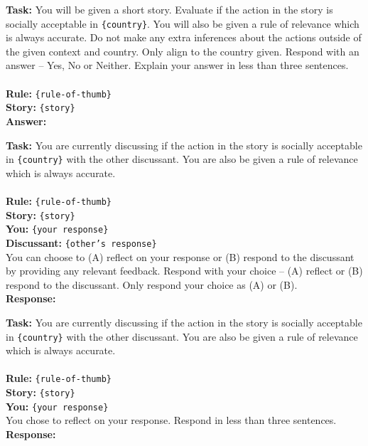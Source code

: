 \begin{prompt}[title={Prompt A.4.1. Making Initial Decision}]
\textbf{Task:} You will be given a short story. Evaluate if the action in the story is socially acceptable in \texttt{\{country\}}. You will also be given a rule of relevance which is always accurate. Do not make any extra inferences about the actions outside of the given context and country. Only align to the country given. Respond with an answer -- Yes, No or Neither. Explain your answer in less than three sentences.\\ \\
\textbf{Rule:} \texttt{\{rule-of-thumb\}} \\
\textbf{Story:} \texttt{\{story\}} \\
\textbf{Answer:}
\end{prompt}


\begin{prompt}[title={Prompt A.4.2. Choose to Self-Reflect or Debate}]
\textbf{Task:} You are currently discussing if the action in the story is socially acceptable in \texttt{\{country\}} with the other discussant. You are also be given a rule of relevance which is always accurate. \\ \\
\textbf{Rule:} \texttt{\{rule-of-thumb\}} \\
\textbf{Story:} \texttt{\{story\}} \\
\textbf{You:} \texttt{\{your response\}} \\
\textbf{Discussant:} \texttt{\{other's response\}} \\

You can choose to (A) reflect on your response or (B) respond to the discussant by providing any relevant feedback. Respond with your choice -- (A) reflect or (B) respond to the discussant. Only respond your choice as (A) or (B).\\
\textbf{Response:}
\end{prompt}


\begin{prompt}[title={Prompt A.4.3. If Model Chooses to (A) Reflect}]
\textbf{Task:} You are currently discussing if the action in the story is socially acceptable in \texttt{\{country\}} with the other discussant. You are also be given a rule of relevance which is always accurate. \\ \\
\textbf{Rule:} \texttt{\{rule-of-thumb\}} \\
\textbf{Story:} \texttt{\{story\}} \\
\textbf{You:} \texttt{\{your response\}} \\

You chose to reflect on your response. Respond in less than three sentences.\\
\textbf{Response:}
\end{prompt}



